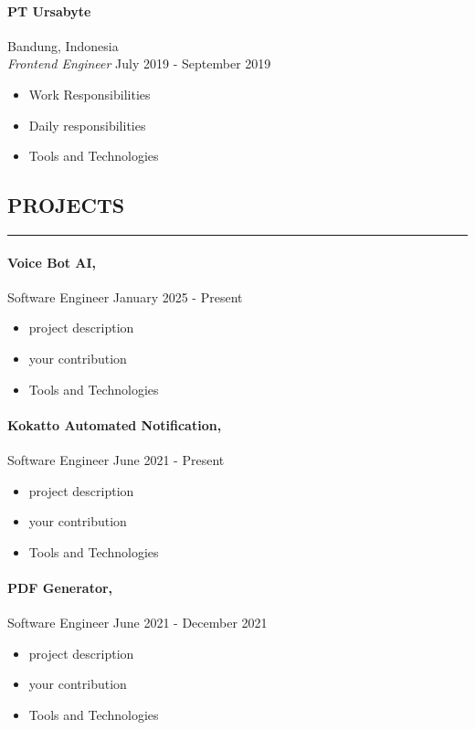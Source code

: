 \documentclass{article}
\begin{document}
\paragraph{PT Ursabyte} \hfill Bandung, Indonesia \\
{\it Frontend Engineer} \hfill July 2019 - September 2019
\vspace{-0.5em}
\begin{itemize}
    \setlength{\itemsep}{-0.3em}
    \item Work Responsibilities
    \item Daily responsibilities
    \item Tools and Technologies
\end{itemize}

\subsection*{PROJECTS}
\vspace{-0.1em}
\hrule
\vspace{0.4em}
\paragraph{Voice Bot AI,} Software Engineer \hfill January 2025 - Present
\vspace{-0.5em}
\begin{itemize}
    \setlength{\itemsep}{-0.3em}
    \item project description
    \item your contribution
    \item Tools and Technologies
\end{itemize}
\vspace{-2em}
\paragraph{Kokatto Automated Notification,} Software Engineer \hfill June 2021 - Present
\vspace{-0.5em}
\begin{itemize}
    \setlength{\itemsep}{-0.3em}
    \item project description
    \item your contribution
    \item Tools and Technologies
\end{itemize}
\vspace{-2em}
\paragraph{PDF Generator,} Software Engineer \hfill June 2021 - December 2021
\vspace{-0.5em}
\begin{itemize}
    \setlength{\itemsep}{-0.3em}
    \item project description
    \item your contribution
    \item Tools and Technologies
\end{itemize}
\vspace{-2em}
\end{document}
